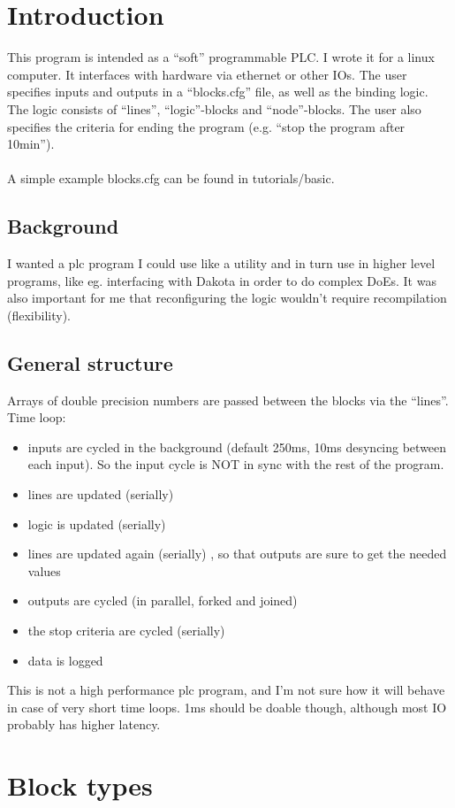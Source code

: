 \documentclass[a4paper]{article}
\begin{document}
\section{Introduction}
This program is intended as a ``soft'' programmable PLC. I wrote it for a linux computer. It interfaces with hardware via ethernet or other IOs. The user specifies inputs and outputs in a ``blocks.cfg'' file, as well as the binding logic. The logic consists of ``lines'', ``logic''-blocks and ``node''-blocks. The user also specifies the criteria for ending the program (e.g. ``stop the program after 10min'').\\\\
A simple example blocks.cfg can be found in tutorials/basic.
\subsection{Background}
I wanted a plc program I could use like a utility and in turn use in higher level programs, like eg. interfacing with Dakota in order to do complex DoEs. It was also important for me that reconfiguring the logic wouldn't require recompilation (flexibility). 
\subsection{General structure}
Arrays of double precision numbers are passed between the blocks via the ``lines''.
Time loop:
\begin{itemize}
  \item inputs are cycled in the background (default 250ms, 10ms desyncing between each input). So the input cycle is NOT in sync with the rest of the program.
  \item lines are updated (serially)
  \item logic is updated (serially) 
  \item lines are updated again (serially) , so that outputs are sure to get the needed values 
  \item outputs are cycled (in parallel, forked and joined)
  \item the stop criteria are cycled (serially)
  \item data is logged
\end{itemize}
This is not a high performance plc program, and I'm not sure how it will behave in case of very short time loops. 1ms should be doable though, although most IO probably has higher latency.
\section{Block types}
\end{document}
